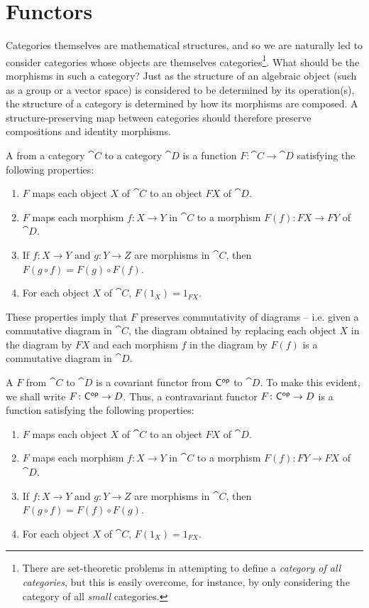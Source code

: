 \section{Functors}

Categories themselves are mathematical structures, and so we are naturally led to consider categories whose objects are themselves categories\footnote{There are set-theoretic problems in attempting to define a \emph{category of all categories}, but this is easily overcome, for instance, by only considering the category of all \emph{small} categories.}. What should be the morphisms in such a category? Just as the structure of an algebraic object (such as a group or a vector space) is considered to be determined by its operation(s), the structure of a category is determined by how its morphisms are composed. A structure-preserving map between categories should therefore preserve compositions and identity morphisms.

A  from a category $\cat C$ to a category $\cat D$ is a function $F \colon \cat C \to \cat D$ satisfying the following properties:
\begin{enumerate}[label = (\roman*)]
\item $F$ maps each object $X$ of $\cat C$ to an object $FX$ of $\cat D$.
\item $F$ maps each morphism $f \colon X \to Y$ in $\cat C$ to a morphism $F(f) \colon FX \to FY$ of $\cat D$.
\item If $f \colon X \to Y$ and $g \colon Y \to Z$ are morphisms in $\cat C$, then $F(g \circ f) = F(g) \circ F(f)$.
\item For each object $X$ of $\cat C$, $F(1_X) = 1_{FX}$.
\end{enumerate}

These properties imply that $F$ preserves commutativity of diagrams -- i.e. given a commutative diagram in $\cat C$, the diagram obtained by replacing each object $X$ in the diagram by $FX$ and each morphism $f$ in the diagram by $F(f)$ is a commutative diagram in $\cat D$.

A  $F$ from $\cat C$ to $\cat D$ is a covariant functor from $\mathsf{C}^\mathsf{op}$ to $\cat D$. To make this evident, we shall write $F \colon \mathsf{C}^\mathsf{op} \to D$. Thus, a contravariant functor $F \colon \mathsf{C}^\mathsf{op} \to D$ is a function satisfying the following properties:
\begin{enumerate}[label = (\roman*)]
\item $F$ maps each object $X$ of $\cat C$ to an object $FX$ of $\cat D$.
\item $F$ maps each morphism $f \colon X \to Y$ in $\cat C$ to a morphism $F(f) \colon FY \to FX$ of $\cat D$.
\item If $f \colon X \to Y$ and $g \colon Y \to Z$ are morphisms in $\cat C$, then $F(g \circ f) = F(f) \circ F(g)$.
\item For each object $X$ of $\cat C$, $F(1_X) = 1_{FX}$.
\end{enumerate}

